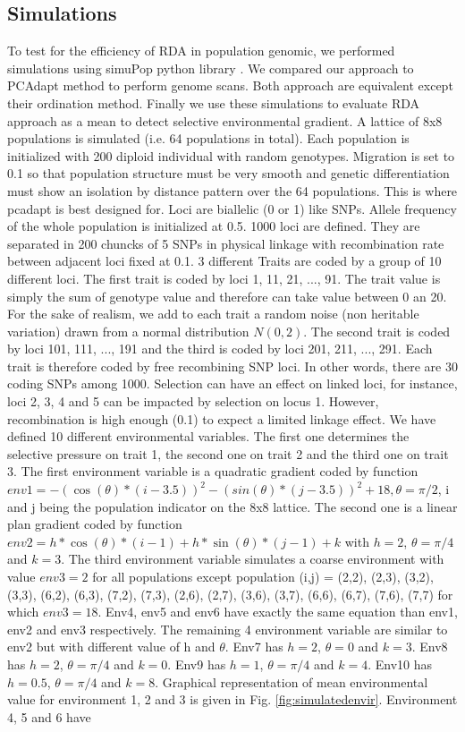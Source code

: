 \documentclass[a4paper,times,10pt,authoryear]{article}%
\begin{document}
\subsection{Simulations}

To test for the efficiency of RDA in population genomic, we performed simulations using simuPop python library \citep{Peng2005}. We compared our approach to PCAdapt method to perform genome scans. Both approach are equivalent except their ordination method. Finally we use these simulations to evaluate RDA approach as a mean to detect selective environmental gradient.
	A lattice of 8x8 populations is simulated (i.e. 64 populations in total). Each population is initialized with 200 diploid individual with random genotypes. Migration is set to 0.1 so that population structure must be very smooth and genetic differentiation must show an isolation by distance pattern over the 64 populations. This is where pcadapt is best designed for. Loci are biallelic (0 or 1) like SNPs. Allele frequency of the whole population is initialized at 0.5. 1000 loci are defined. They are separated in 200 chuncks of 5 SNPs in physical linkage with recombination rate between adjacent loci fixed at 0.1. 3 different Traits are coded by a group of 10 different loci. The first trait is coded by loci 1, 11, 21, ..., 91. The trait value is simply the sum of genotype value and therefore can take value between 0 an 20. For the sake of realism, we add to each trait a random noise (non heritable variation) drawn from a normal distribution $N(0,2)$. The second trait is coded by loci 101, 111, ..., 191 and the third is coded by loci 201, 211, ..., 291. Each trait is therefore coded by free recombining SNP loci. In other words, there are 30 coding SNPs among 1000. Selection can have an effect on linked loci, for instance, loci 2, 3, 4 and 5 can be impacted by selection on locus 1. However, recombination is high enough (0.1) to expect a limited linkage effect. We have defined 10 different environmental variables. The first one determines the selective pressure on trait 1, the second one on trait 2 and the third one on trait 3. The first environment variable is a quadratic gradient coded by function  $env1 = -(\cos(\theta)*(i-3.5))^2 -(sin(\theta)*(j-3.5))^2 + 18, \theta = \pi/2$, i and j being the population indicator on the 8x8 lattice. The second one is a linear plan gradient coded by function $env2 = h*\cos(\theta)*(i-1) + h*\sin(\theta)*(j-1) + k$ with $h=2$, $\theta = \pi/4$ and $k=3$. The third environment variable simulates a coarse environment with value $env3 = 2$ for all populations except population (i,j) = {(2,2), (2,3), (3,2), (3,3), (6,2), (6,3), (7,2), (7,3), (2,6), (2,7), (3,6), (3,7), (6,6), (6,7), (7,6), (7,7)} for which $env3 = 18$. Env4, env5 and env6 have exactly the same equation than env1, env2 and env3 respectively. The remaining 4 environment variable are similar to env2 but with different value of h and $\theta$. Env7 has $h=2$, $\theta = 0$ and $k=3$. Env8 has $h=2$, $\theta = \pi/4$ and $k=0$. Env9 has $h=1$, $\theta = \pi/4$ and $k=4$. Env10 has $h=0.5$, $\theta = \pi/4$ and $k=8$. Graphical representation of mean environmental value for environment 1, 2 and 3 is given in Fig. \ref{fig:simulatedenvir}. Environment 4, 5 and 6 have 
\end{document}
